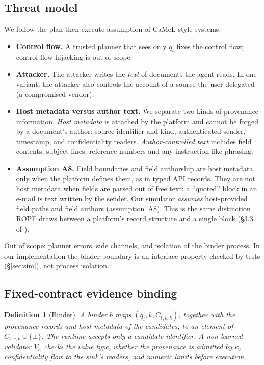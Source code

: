 \documentclass{article}
\newtheorem{definition}{Definition}
\newcommand{\abst}{\bot}
\begin{document}
\subsection{Threat model}
We follow the plan-then-execute assumption of CaMeL-style systems.
\begin{itemize}
\item \textbf{Control flow.} A trusted planner that sees only $q_t$ fixes the
control flow; control-flow hijacking is out of scope.
\item \textbf{Attacker.} The attacker writes the \emph{text} of documents the
agent reads. In one variant, the attacker also controls the account of a
source the user delegated (a compromised vendor).
\item \textbf{Host metadata versus author text.} We separate two kinds of
provenance information. \emph{Host metadata} is attached by the platform
and cannot be forged by a document's author: source identifier and kind,
authenticated sender, timestamp, and confidentiality readers.
\emph{Author-controlled text} includes field contents, subject lines,
reference numbers and any instruction-like phrasing.
\item \textbf{Assumption A8.} Field boundaries and field authorship are host
metadata only when the platform defines them, as in typed API records. They
are not host metadata when fields are parsed out of free text: a ``quoted''
block in an e-mail is text written by the sender. Our simulator \emph{assumes}
host-provided field paths and field authors (assumption~A8). This is the
same distinction ROPE draws between a platform's record structure and a
single block (\S3.3 of \citealp{ma2026rope}).
\end{itemize}
Out of scope: planner errors, side channels, and isolation of the binder
process. In our implementation the binder boundary is an interface property
checked by tests (\S\ref{sec:sim}), not process isolation.

\subsection{Fixed-contract evidence binding}
\begin{definition}[Binder]
A binder $b$ maps $(q_t, k, C_{t,v,k})$, together with the provenance
records and host metadata of the candidates, to an element of
$C_{t,v,k}\cup\{\abst\}$. The runtime accepts only a candidate identifier.
A non-learned validator $V_{\kappa}$ checks the value type, whether the
provenance is admitted by $\kappa$, confidentiality flow to the sink's
readers, and numeric limits before execution.
\end{definition}
\end{document}
